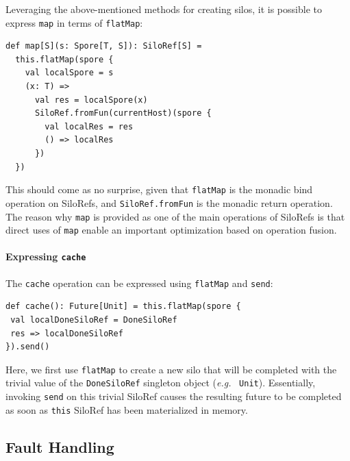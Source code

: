 \documentclass{jfp1}
\newcommand\eg{\emph{e.g.}\ }
\begin{document}
Leveraging the above-mentioned methods for creating silos, it is possible to
express \verb|map| in terms of \verb|flatMap|:

\begin{lstlisting}
def map[S](s: Spore[T, S]): SiloRef[S] =
  this.flatMap(spore {
    val localSpore = s
    (x: T) =>
      val res = localSpore(x)
      SiloRef.fromFun(currentHost)(spore {
        val localRes = res
        () => localRes
      })
  })
\end{lstlisting}
\noindent
This should come as no surprise, given that \verb|flatMap| is the monadic bind
operation on SiloRefs, and \verb|SiloRef.fromFun| is the monadic return
operation. The reason why \verb|map| is provided as one of the main operations
of SiloRefs is that direct uses of \verb|map| enable an important optimization
based on operation fusion.

\paragraph{Expressing \texttt{cache}}

The \verb|cache| operation can be expressed using \verb|flatMap| and
\verb|send|:

\begin{lstlisting}
def cache(): Future[Unit] = this.flatMap(spore {
 val localDoneSiloRef = DoneSiloRef
 res => localDoneSiloRef
}).send()

\end{lstlisting}
\noindent
Here, we first use \verb|flatMap| to create a new silo that will be completed
with the trivial value of the \verb|DoneSiloRef| singleton object (\eg
\verb|Unit|). Essentially, invoking \verb|send| on this trivial SiloRef causes
the resulting future to be completed as soon as \verb|this| SiloRef has been
materialized in memory.





\subsection{Fault Handling}
\label{sec:fault-handling}
\end{document}
